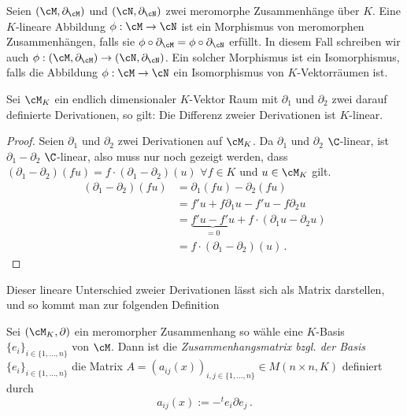 \begin{defn}
Seien $(\cM,\partial_\cM)$ und $(\cN,\partial_\cN)$ zwei meromorphe
Zusammenhänge über $K$. Eine $K$-lineare Abbildung $\phi:\cM\rightarrow\cN$
ist ein Morphismus von meromorphen Zusammenhängen, falls sie
$\phi\circ\partial_\cM=\phi\circ\partial_\cN$ erfüllt. In diesem Fall
schreiben wir auch $\phi:(\cM,\partial_\cM)\rightarrow(\cN,\partial_\cN)$.
Ein solcher Morphismus ist ein Isomorphismus, falls die Abbildung
$\phi:\cM\rightarrow\cN$ ein Isomorphismus von $K$-Vektorräumen ist.
\end{defn}

\begin{comment}
TODO: entfernen
\begin{defn}
Wir erhalten damit die Kategorie der meromorphen Zusammenhänge über $K$ mit
\begin{align*}
\text{Objekte: } & (M,\partial)\text{ meromorpher Zusammenhang über }K
\\\text{Morphismen: } & (M,\partial)\overset{f}{\rightarrow}(M',\partial')
\text{ Morphismus von meromorphen Zusammenhängen.}
\end{align*}
\end{defn}
\end{comment}

\begin{lem}
Sei $\cM_K$ ein endlich dimensionaler $K$-Vektor Raum mit $\partial_1$ und
$\partial_2$ zwei darauf definierte Derivationen, so gilt: Die Differenz zweier
Derivationen ist $K$-linear.
\end{lem}
\begin{proof}
Seien $\partial_1$ und $\partial_2$ zwei Derivationen auf $\cM_K$.
Da $\partial_1$ und $\partial_2$ $\C$-linear, ist $\partial_1-\partial_2$
$\C$-linear, also muss nur noch gezeigt werden, dass
$(\partial_1-\partial_2)(fu)=f\cdot(\partial_1-\partial_2)(u)$ $\forall f\in
K$ und $u\in\cM_K$ gilt.
\begin{align*}
(\partial_1-\partial_2)(fu) &= \partial_1(fu)-\partial_2(fu)\\
&= f'u+f\partial_1u-f'u-f\partial_2u\\
&= \underset{=0}{\underbrace{f'u-f'u}}+f\cdot(\partial_1u-\partial_2u)\\
&= f\cdot(\partial_1-\partial_2)(u) \,.
\end{align*}
\end{proof}
Dieser lineare Unterschied zweier Derivationen lässt sich als Matrix
darstellen, und so kommt man zur folgenden Definition
\begin{comment}
\cite[Seite 129]{hotta2007d}
\end{comment}
\begin{defn}[Zusammenhangsmatrix]
Sei $(\cM_K,\partial)$ ein meromorpher Zusammenhang so wähle eine $K$-Basis
$\{e_i\}_{i\in\{1,\dots,n\}}$ von $\cM$. Dann ist die
\emph{Zusammenhangsmatrix bzgl. der Basis $\{e_i\}_{i\in\{1,\dots,n\}}$} die
Matrix $A=(a_{ij}(x))_{i,j\in\{1,\dots,n\}}\in M(n\times n,K)$ definiert
durch
\[ 
a_{ij}(x) := -^te_i \partial e_j \,. 
\]
\end{defn}

